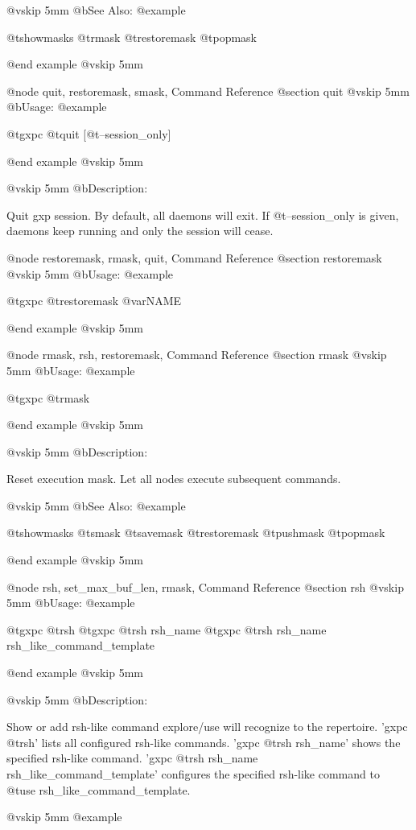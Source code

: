@vskip 5mm
@b{See Also:}
@example

  @t{showmasks} @t{rmask} @t{restoremask} @t{popmask}

@end example
@vskip 5mm

@node quit, restoremask, smask, Command Reference
@section quit
@vskip 5mm
@b{Usage:}
@example

  @t{gxpc} @t{quit} [@t{--session_only}]

@end example
@vskip 5mm

@vskip 5mm
@b{Description:}


  Quit gxp session. By default, all daemons will exit.
If @t{--session_only} is given, daemons keep running and only the 
session will cease.

@node restoremask, rmask, quit, Command Reference
@section restoremask
@vskip 5mm
@b{Usage:}
@example

  @t{gxpc} @t{restoremask} @var{NAME}

@end example
@vskip 5mm

@node rmask, rsh, restoremask, Command Reference
@section rmask
@vskip 5mm
@b{Usage:}
@example

  @t{gxpc} @t{rmask}

@end example
@vskip 5mm

@vskip 5mm
@b{Description:}


  Reset execution mask. Let all nodes execute subsequent commands.

@vskip 5mm
@b{See Also:}
@example

  @t{showmasks} @t{smask} @t{savemask} @t{restoremask} @t{pushmask} @t{popmask}

@end example
@vskip 5mm

@node rsh, set_max_buf_len, rmask, Command Reference
@section rsh
@vskip 5mm
@b{Usage:}
@example

  @t{gxpc} @t{rsh}
  @t{gxpc} @t{rsh} rsh_name
  @t{gxpc} @t{rsh} rsh_name rsh_like_command_template

@end example
@vskip 5mm

@vskip 5mm
@b{Description:}


  Show or add rsh-like command explore/use will recognize to the repertoire.
  'gxpc @t{rsh}' lists all configured rsh-like commands.
  'gxpc @t{rsh} rsh_name' shows the specified rsh-like command.
  'gxpc @t{rsh} rsh_name rsh_like_command_template' configures the specified rsh-like
  command to @t{use} rsh_like_command_template.

@vskip 5mm
@example

